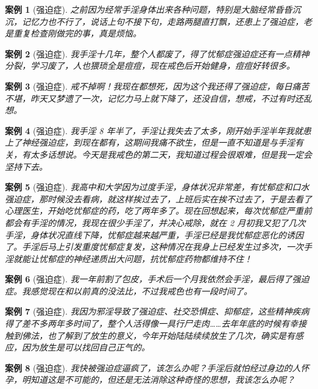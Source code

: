 \documentclass{ctexart}
\newtheorem{case}{案例}
\begin{document}
\begin{case}[强迫症]
    之前因为经常手淫身体出来各种问题，特别是大脑经常昏昏沉沉，记忆力也不行了，说话上句不接下句，走路两腿直打飘，还患上了强迫症，老是重复检查刚做完的事，真是烦恼。
\end{case}

\begin{case}[强迫症]
    我手淫十几年，整个人都废了，得了忧郁症强迫症还有一点精神分裂，学习废了，人也猥琐全是痘痘，现在戒色后开始健身，痘痘好转很多。
\end{case}

\begin{case}[强迫症]
    戒不掉啊！我现在都想死，因为这个我还得了强迫症，每日痛苦不堪，昨天又梦遗了一次，记忆力马上就下降了，还没自信，想戒，不过有时还乱想。
\end{case}

\begin{case}[强迫症]
    我手淫 8 年半了，手淫让我失去了太多，刚开始手淫半年我就患上了神经强迫症，到现在都有，这期间我痛不欲生，但是一直不知道是与手淫有关，有太多话想说。今天是我戒色的第二天，我知道过程会很艰难，但是我一定会坚持下去。
\end{case}

\begin{case}[强迫症]
    我高中和大学因为过度手淫，身体状况非常差，有忧郁症和口水强迫症，那时候没去看病，就这样挨过去了，上班后实在挨不过去了，于是去看了心理医生，开始吃忧郁症的药，吃了两年多了。现在回想起来，每次忧郁症严重前都会有手淫的情况，我现在很少手淫了，并决心戒除，就在 2 月初我又犯了几次手淫，身体状况直线下降，忧郁症越来越严重，手淫已经是我忧郁症恶化的诱因了。手淫后马上引发重度忧郁症复发，这种情况在我身上已经发生过多次，一次手淫就能让忧郁症的神经递质出大问题，抗忧郁症药物都维持不住！
\end{case}

\begin{case}[强迫症]
    我一年前割了包皮，手术后一个月我依然会手淫，最后得了强迫症。我感觉现在和以前真的没法比，不过我戒色也有一段时间了。
\end{case}

\begin{case}[强迫症]
    我因为邪淫导致了强迫症、社交恐惧症、抑郁症，这些精神疾病得了差不多两年多时间了，整个人活得像一具行尸走肉……去年年底的时候有幸接触到佛法，也了解到了放生的意义，今年开始陆陆续续放生了几次，确实是有感应，因为放生是可以找回自己正气的。
\end{case}

\begin{case}[强迫症]
    我快被强迫症逼疯了，该怎么办呢？手淫后就怕经过身边的人怀孕，明知道这是不可能的，但还是无法消除这种奇怪的思想，我该怎么办呢？
\end{case}
\end{document}
